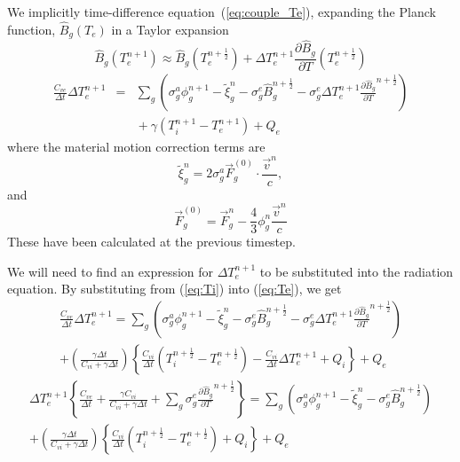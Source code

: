 \documentclass[12pt]{article}
\newcommand{\partl}[2]{\ensuremath{\frac{\partial{#1}}{\partial{#2}}}}\newcommand{\del}{\ensuremath{\vec{\nabla}}}
\newcommand{\dt}{\ensuremath{\Delta t}}
\newcommand{\cviOdt}{\ensuremath{\frac{C_{vi}}{\dt}}}
\newcommand{\cveOdt}{\ensuremath{\frac{C_{ve}}{\dt}}}
\newcommand{\Bg}{\ensuremath{\hat{B}_{g}}}
\newcommand{\Bgnphlf}{\ensuremath{\hat{B}_{g}^{n+\frac{1}{2}}}}
\newcommand{\pBgnphlfdT}{\ensuremath{\frac{\partial\hat{B}_{g}}{\partial T}^{n+\frac{1}{2}}}}
\begin{document}
We implicitly time-difference equation~(\ref{eq:couple_Te}),
expanding the Planck function,
$\Bg(T_{e})$ in a Taylor expansion
\begin{equation}
        \Bg(T_{e}^{n+1}) \approx \Bg(T_{e}^{n+\frac{1}{2}})
                 + \Delta T_{e}^{n+1} \partl{\Bg}{T}(T_{e}^{n+\frac{1}{2}})
\end{equation}
\begin{eqnarray}
        \cveOdt \Delta T_{e}^{n+1} &=&
                \sum_{g} \left(
                        \sigma_{g}^{a} \phi_{g}^{n+1} - \tilde{\xi}_{g}^{n}
                        - \sigma_{g}^{e} \Bgnphlf
                        - \sigma_{g}^{e} \Delta T_{e}^{n+1} \pBgnphlfdT 
                        \right) \nonumber \\
                & & \mbox{} + \gamma (T_{i}^{n+1} - T_{e}^{n+1}) + Q_{e}
\label{eq:Te}
\end{eqnarray}
where the material motion correction terms are
\begin{equation}
        \tilde{\xi}_{g}^{n} = 2 \sigma_{g}^{a} \vec{F}_{g}^{(0)} \cdot
                                \frac{\vec{v}^{n}}{c}, 
\label{eq:tilde_xi}
\end{equation}
and
\begin{equation}
        \vec{F}_{g}^{(0)} = \vec{F}_{g}^{n} - \frac{4}{3} \phi_{g}^{n}
                                                \frac{\vec{v}^{n}}{c}
\end{equation}
These have been calculated at the previous timestep.

We will need to find an expression for $\Delta T_{e}^{n+1}$ to be
substituted into the radiation equation.
By substituting from (\ref{eq:Ti}) into (\ref{eq:Te}), we get
\begin{multline}
        \cveOdt \Delta T_{e}^{n+1} =
                \sum_{g} \left(
                        \sigma_{g}^{a} \phi_{g}^{n+1} - \tilde{\xi}_{g}^{n}
                        - \sigma_{g}^{e} \Bgnphlf
                        - \sigma_{g}^{e} \Delta T_{e}^{n+1} \pBgnphlfdT 
                        \right)
        \\
                         + \left(\frac{\gamma\dt}{C_{vi} + 
                                        \gamma \dt} \right)
                        \left\{\cviOdt(T_{i}^{n+\frac{1}{2}}-T_{e}^{n+\frac{1}{2}})
                                 - \cviOdt \Delta T_{e}^{n+1}
                        + Q_{i} \right\}
                        + Q_{e}
\end{multline}
\begin{multline}
        \Delta T_{e}^{n+1} \left\{ \cveOdt +
                \frac{\gamma C_{vi}}{C_{vi} + \gamma \dt } +
                \sum_{g} \sigma_{g}^{e} \pBgnphlfdT \right\} =
                   \sum_{g} \left( \sigma_{g}^{a} \phi_{g}^{n+1} - 
                        \tilde{\xi}_{g}^{n} - \sigma_{g}^{e} \Bgnphlf \right)
        \\
                  +  \left(\frac{\gamma\dt}{C_{vi} + 
                                        \gamma \dt} \right)
                        \left\{\cviOdt(T_{i}^{n+\frac{1}{2}}-T_{e}^{n+\frac{1}{2}}) + Q_{i} \right\}
                         + Q_{e}
\end{multline}
\end{document}
